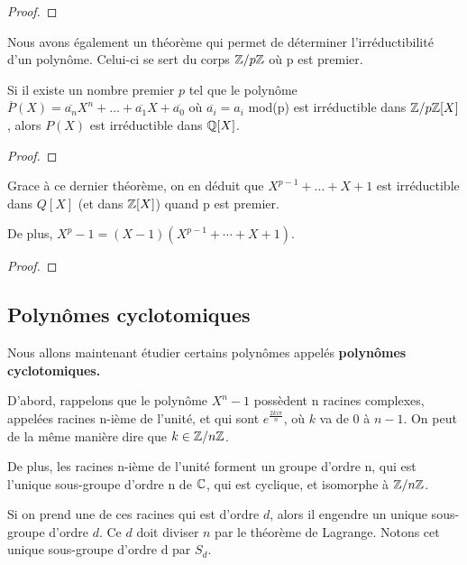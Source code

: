 \ifdefined\outputproof
\begin{proof}

\end{proof}
\fi

Nous avons également un théorème qui permet de déterminer l'irréductibilité d'un
polynôme. Celui-ci se sert du corps $\mathbb{Z}/p\mathbb{Z}$ où p est premier.

\begin{theorem}
	Si il existe un nombre premier $p$ tel que le polynôme $\overline{P}(X) =
	\overline{a_{n}}X^{n} + \ldots + \overline{a_{1}}X + \overline{a_{0}}$ où
	$\overline{a_{i}} = a_{i}$ mod(p) est irréductible dans
	$\mathbb{Z}/p\mathbb{Z}[X]$, alors $P(X)$ est irréductible dans $\mathbb{Q}[X]$.
\end{theorem}

\ifdefined\outputproof
\begin{proof}

\end{proof}
\fi

\begin{corollary}
	Grace à ce dernier théorème, on en déduit que $X^{p - 1} + \ldots + X + 1$
	est irréductible dans $Q[X]$ (et dans $\mathbb{Z}[X]$) quand p est premier.

	De plus, $X^{p} - 1 = (X - 1) (X^{p - 1} + \cdots + X + 1)$.
\end{corollary}

\ifdefined\outputproof
\begin{proof}

\end{proof}
\fi


\subsection{Polynômes cyclotomiques}

Nous allons maintenant étudier certains polynômes appelés \textbf{polynômes
cyclotomiques.}

D'abord, rappelons que le polynôme $X^{n} - 1$ possèdent n racines complexes,
appelées racines n-ième de l'unité, et qui sont $e^{\frac{2ki\pi}{n}}$, où $k$ va
de $0$ à $n - 1$. On peut de la même manière dire que $k \in
\mathbb{Z}/n\mathbb{Z}$.

De plus, les racines n-ième de l'unité forment un groupe d'ordre n, qui est
l'unique sous-groupe d'ordre n de $\mathbb{C}$, qui est cyclique, et isomorphe à
$\mathbb{Z}/n\mathbb{Z}$.

Si on prend une de ces racines qui est d'ordre $d$, alors il engendre un
unique sous-groupe d'ordre $d$. Ce $d$ doit diviser $n$ par le théorème de
Lagrange. Notons cet unique sous-groupe d'ordre d par $S_{d}$.

